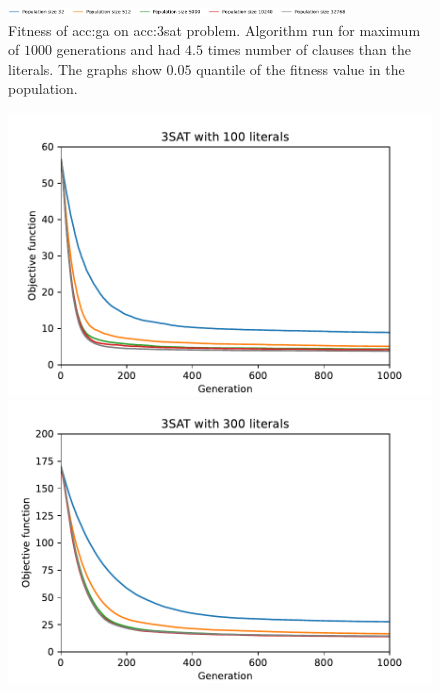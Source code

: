 \begin{figure}[ht!]
    \begin{minipage}{\textwidth}
        \centering
        \includegraphics[width=0.8\textwidth]{img/runs/fitness_ga_3SAT_legend.pdf}
    \end{minipage}

    \caption[Fitness of genetic algorithm]{Fitness of \acrlong{acc:ga} on \acrshort{acc:3sat} problem. Algorithm run for maximum of $1000$ generations and had $4.5$ times number of clauses than the literals. The graphs show $0.05$ quantile of the fitness value in the population.}
    \label{meas:gafitness}
\end{figure}

\begin{figure}[ht!]
    \begin{minipage}[t]{0.32\textwidth}
        \centering
        \includegraphics[width=\textwidth]{img/runs/fitness_ga_elitism_3SAT_d100.pdf}
    \end{minipage}
    \hfill
    \begin{minipage}[t]{0.32\textwidth}
        \centering
        \includegraphics[width=\textwidth]{img/runs/fitness_ga_elitism_3SAT_d300.pdf}

\end{minipage}
\end{figure}

